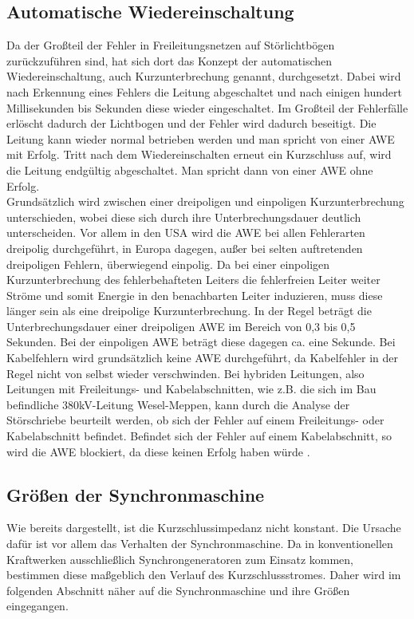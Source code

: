 \documentclass{scrartcl}
\begin{document}
\begin{onehalfspace}
\subsection{Automatische Wiedereinschaltung}
Da der Großteil der Fehler in Freileitungsnetzen auf Störlichtbögen zurückzuführen sind, hat sich dort das Konzept der automatischen Wiedereinschaltung, auch Kurzunterbrechung genannt, durchgesetzt. Dabei wird nach Erkennung eines Fehlers die Leitung abgeschaltet und nach einigen hundert Millisekunden bis Sekunden diese wieder eingeschaltet. Im Großteil der Fehlerfälle erlöscht dadurch der Lichtbogen und der Fehler wird dadurch beseitigt. Die Leitung kann wieder normal betrieben werden und man spricht von einer \glqq AWE mit Erfolg\grqq. Tritt nach dem Wiedereinschalten erneut ein Kurzschluss auf, wird die Leitung endgültig abgeschaltet. Man spricht dann von einer \glqq AWE ohne Erfolg\grqq. \\
Grundsätzlich wird zwischen einer dreipoligen und einpoligen Kurzunterbrechung unterschieden, wobei diese sich durch ihre Unterbrechungsdauer deutlich unterscheiden. Vor allem in den USA wird die AWE bei allen Fehlerarten dreipolig durchgeführt, in Europa dagegen, außer bei selten auftretenden dreipoligen Fehlern, überwiegend einpolig. Da bei einer einpoligen Kurzunterbrechung des fehlerbehafteten Leiters die fehlerfreien Leiter weiter Ströme und somit Energie in den benachbarten Leiter induzieren, muss diese länger sein als eine dreipolige Kurzunterbrechung. In der Regel beträgt die Unterbrechungsdauer einer dreipoligen AWE im Bereich von 0,3 bis 0,5 Sekunden. Bei der einpoligen AWE beträgt diese dagegen ca. eine Sekunde\cite[S. 66]{Ziegler2008}. Bei Kabelfehlern wird grundsätzlich keine AWE durchgeführt, da Kabelfehler in der Regel nicht von selbst wieder verschwinden. Bei hybriden Leitungen, also Leitungen mit Freileitungs- und Kabelabschnitten, wie z.B. die sich im Bau befindliche 380kV-Leitung Wesel-Meppen, kann durch die Analyse der Störschriebe beurteilt werden, ob sich der Fehler auf einem Freileitungs- oder Kabelabschnitt befindet. Befindet sich der Fehler auf einem Kabelabschnitt, so wird die AWE blockiert, da diese keinen Erfolg haben würde \cite{hybrid-ltg}.

\subsection{Größen der Synchronmaschine}
Wie bereits dargestellt, ist die Kurzschlussimpedanz nicht konstant. Die Ursache dafür ist vor allem das Verhalten der Synchronmaschine. Da in konventionellen Kraftwerken ausschließlich Synchrongeneratoren zum Einsatz kommen, bestimmen diese maßgeblich den Verlauf des Kurzschlussstromes. Daher wird im folgenden Abschnitt näher auf die Synchronmaschine und ihre Größen eingegangen.


\end{onehalfspace}
\end{document}
